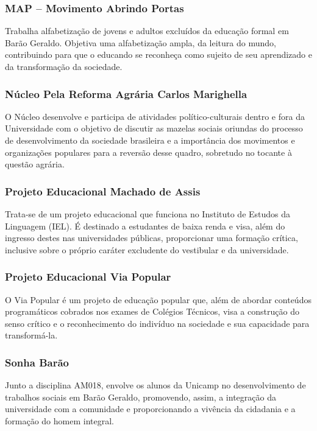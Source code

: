 \subsubsection{MAP -- Movimento Abrindo Portas}

Trabalha alfabetização de jovens e adultos excluídos da educação formal em Barão
Geraldo. Objetiva uma alfabetização ampla, da leitura do mundo, contribuindo
para que o educando se reconheça como sujeito de seu aprendizado e da
transformação da sociedade.

\subsubsection{Núcleo Pela Reforma Agrária Carlos Marighella}

O Núcleo desenvolve e participa de atividades político-culturais dentro e fora
da Universidade com o objetivo de discutir as mazelas sociais oriundas do
processo de desenvolvimento da sociedade brasileira e a importância dos
movimentos e organizações populares para a reversão desse quadro, sobretudo no
tocante à questão agrária.

\subsubsection{Projeto Educacional Machado de Assis}

Trata-se de um projeto educacional que funciona no Instituto de Estudos da
Linguagem (IEL). É destinado a estudantes de baixa renda e visa, além do
ingresso destes nas universidades públicas, proporcionar uma formação crítica,
inclusive sobre o próprio caráter excludente do vestibular e da universidade.

\subsubsection{Projeto Educacional Via Popular}

O Via Popular é um projeto de educação popular que, além de abordar conteúdos
programáticos cobrados nos exames de Colégios Técnicos, visa a construção do
senso crítico e o reconhecimento do indivíduo na sociedade e sua capacidade para
transformá-la.

\subsubsection{Sonha Barão}

Junto a disciplina AM018, envolve os alunos da Unicamp no desenvolvimento de
trabalhos sociais em Barão Geraldo, promovendo, assim, a integração da
universidade com a comunidade e proporcionando a vivência da cidadania
e a formação do homem integral.

